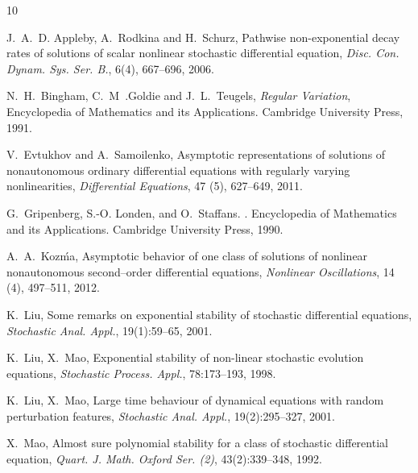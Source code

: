 \documentclass[a4paper,10pt,reqno]{amsart}
\numberwithin{equation}{section}
\theoremstyle{definition}
\theoremstyle{remark}
\DeclareMathOperator{\1}{\mathbbm 1}
\begin{document}
\begin{thebibliography}{10}
		
		J.~A.~D. Appleby, A.~Rodkina and H.~Schurz, Pathwise non-exponential decay rates of solutions of
		scalar nonlinear stochastic differential equation, \emph{Disc. Con. Dynam. Sys. Ser. B.},
		6(4), 667--696, 2006.
		
		N.~H.~Bingham, C.~M~.Goldie and J.~L.~Teugels, {\em Regular Variation},  Encyclopedia of Mathematics and its Applications. Cambridge University Press, 1991.
		
		
		V.~Evtukhov and A.~Samoilenko, Asymptotic representations of solutions of nonautonomous ordinary
		differential equations with regularly varying nonlinearities, \emph{Differential Equations}, 47 (5), 627--649, 2011. 
		
		G.~Gripenberg, S.-O. Londen, and O.~Staffans.
		.
		\newblock Encyclopedia of Mathematics and its Applications. Cambridge University Press, 1990.
		
		A.~A.~Koz\'ma, Asymptotic behavior of one class of solutions of nonlinear nonautonomous second--order differential equations, \textit{Nonlinear Oscillations}, 14 (4), 497--511, 2012. 
		
		K.~Liu, Some remarks on exponential stability of stochastic differential
		equations, {\em Stochastic Anal. Appl.}, 19(1):59--65, 2001.
		
		K.~Liu, X.~Mao, Exponential stability of non-linear stochastic evolution equations, {\em Stochastic Process. Appl.}, 78:173--193, 1998.
		
		K.~Liu, X.~Mao, \newblock Large time behaviour of dynamical equations with random perturbation
		features, {\em Stochastic Anal. Appl.}, 19(2):295--327, 2001.
		
		X.~Mao,  Almost sure polynomial stability for a class of stochastic
		differential equation, {\em Quart. J. Math. Oxford Ser. (2)}, 43(2):339--348, 1992.
		

\end{thebibliography}
\end{document}

